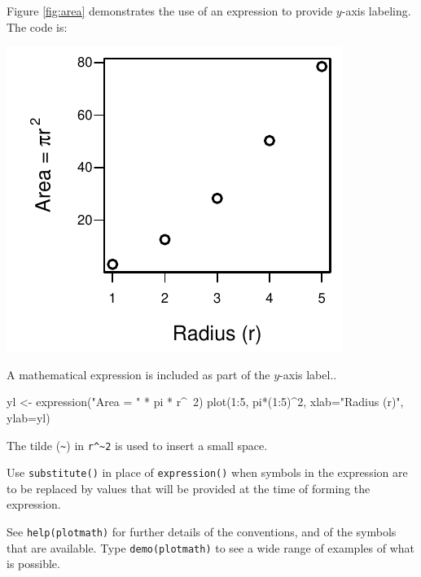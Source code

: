 \documentclass{tufte-book}\usepackage[]{graphicx}\usepackage[]{color}
\newcommand{\txtt}[1]{\texttt{#1}}
\begin{document}
Figure \ref{fig:area} demonstrates the use of an expression to
provide $y$-axis labeling.  The code is:
\begin{marginfigure}
\begin{Schunk}


\centerline{\includegraphics[width=\textwidth]{figs/07-plot-expr-1} }

\end{Schunk}
\caption{A mathematical expression is included as part of the
  $y$-axis label.\label{fig:area}.}
\end{marginfigure}
\begin{Schunk}
\begin{Sinput}
yl <- expression("Area = " * pi * r^~2)
plot(1:5, pi*(1:5)^2, xlab="Radius (r)", ylab=yl)
\end{Sinput}
\end{Schunk}
\noindent The tilde (\verb+~+) in \verb+r^~2+ is used to insert a small space.

Use \txtt{substitute()} in place of \txtt{expression()} when
symbols in the expression are to be replaced by values that
will be provided at the time of forming the expression.

See \txtt{help(plotmath)} for further details of the conventions,
and of the symbols that are available.  Type \txtt{demo(plotmath)}
to see a wide range of examples of what is possible.
\end{document}
